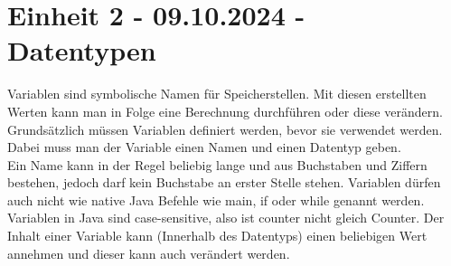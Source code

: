 \documentclass{article}
\begin{document}
	\section{Einheit 2 - 09.10.2024 - Datentypen}
	\label{sec:Datentypen}
	Variablen sind symbolische Namen für Speicherstellen. Mit diesen erstellten Werten kann man in Folge eine Berechnung durchführen oder diese verändern. \\
	Grundsätzlich müssen Variablen definiert werden, bevor sie verwendet werden. Dabei muss man der Variable einen Namen und einen Datentyp geben. \\
	Ein Name kann in der Regel beliebig lange und aus Buchstaben und Ziffern bestehen, jedoch darf kein Buchstabe an erster Stelle stehen. Variablen dürfen auch nicht wie native Java Befehle wie main, if oder while genannt werden. Variablen in Java sind case-sensitive, also ist counter nicht gleich Counter. Der Inhalt einer Variable kann (Innerhalb des Datentyps) einen beliebigen Wert annehmen und dieser kann auch verändert werden. \\
\end{document}
